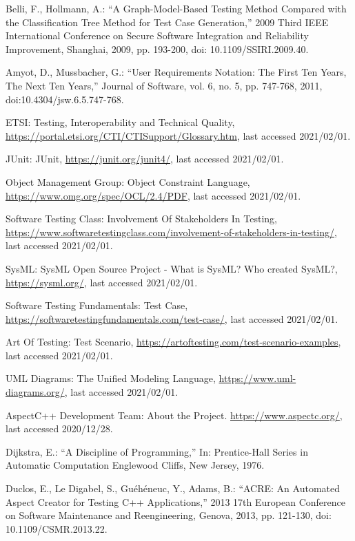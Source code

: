 \documentclass[a4paper,10pt, bibliography=totocnumbered]{scrreprt}
\begin{document}
\begin{thebibliography}{9}
 Belli, F., Hollmann, A.: \enquote{A Graph-Model-Based Testing Method Compared with the Classification Tree Method for Test Case Generation,} 2009 Third IEEE International Conference on Secure Software Integration and Reliability Improvement, Shanghai, 2009, pp. 193-200, doi: 10.1109/SSIRI.2009.40.

 Amyot, D., Mussbacher, G.: \enquote{User Requirements Notation: The First Ten Years, The Next Ten Years,} Journal of Software, vol. 6, no. 5, pp. 747-768, 2011, doi:10.4304/jsw.6.5.747-768.

 ETSI: Testing, Interoperability and Technical Quality, \url{https://portal.etsi.org/CTI/CTISupport/Glossary.htm}, last accessed 2021/02/01.

 JUnit: JUnit, \url{https://junit.org/junit4/}, last accessed 2021/02/01.

 Object Management Group: Object Constraint Language, \url{https://www.omg.org/spec/OCL/2.4/PDF}, last accessed 2021/02/01.

 Software Testing Class: Involvement Of Stakeholders In Testing, \url{https://www.softwaretestingclass.com/involvement-of-stakeholders-in-testing/}, last accessed 2021/02/01.

 SysML: SysML Open Source Project - What is SysML? Who created SysML?, \url{https://sysml.org/}, last accessed 2021/02/01.

 Software Testing Fundamentals: Test Case, \url{https://softwaretestingfundamentals.com/test-case/}, last accessed 2021/02/01.

 Art Of Testing: Test Scenario, \url{https://artoftesting.com/test-scenario-examples}, last accessed 2021/02/01.

 UML Diagrams: The Unified Modeling Language, \url{https://www.uml-diagrams.org/}, last accessed 2021/02/01.




 AspectC++ Development Team: About the Project.
\url{https://www.aspectc.org/}, last accessed 2020/12/28.

 Dijkstra, E.: \enquote{A Discipline of Programming,}
In: Prentice-Hall Series in Automatic Computation Englewood Cliffs, New Jersey, 1976.

 Duclos, E., Le Digabel, S., Guéhéneuc, Y.,  Adams, B.: \enquote{ACRE: An Automated Aspect Creator for Testing C++ Applications,} 2013 17th European Conference on Software Maintenance and Reengineering, Genova, 2013, pp. 121-130, doi: 10.1109/CSMR.2013.22.


\end{thebibliography}
\end{document}
